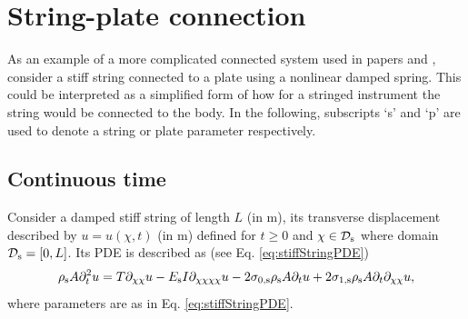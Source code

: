 
\section{String-plate connection}\label{sec:stringPlateConnection}
As an example of a more complicated connected system used in papers \citeP[A] and \citeP[B], consider a stiff string connected to a plate using a nonlinear damped spring. This could be interpreted as a simplified form of how for a stringed instrument the string would be connected to the body. In the following, subscripts `s' and `p' are used to denote a string or plate parameter respectively. 

\subsection{Continuous time}
Consider a damped stiff string of length $L$ (in m), its transverse displacement described by $u = u(\chi,t)$ (in m) defined for $t\geq 0$ and $\chi \in \mathcal{D}_{\text{s}}$ where domain $\mathcal{D}_{\text{s}} = [0, L]$. Its PDE is described as (see Eq. \eqref{eq:stiffStringPDE})
\begin{equation}
    \rho_\stxt A\ptt u = T \partial_{\chi\chi} u - E_\stxt I \partial_{\chi\chi\chi\chi} u - 2\szX[\stxt]\rho_\stxt A\pt u + 2\soX[\stxt]\rho_\stxt A\pt\partial_{\chi\chi} u,
\end{equation}
where parameters are as in Eq. \eqref{eq:stiffStringPDE}.

